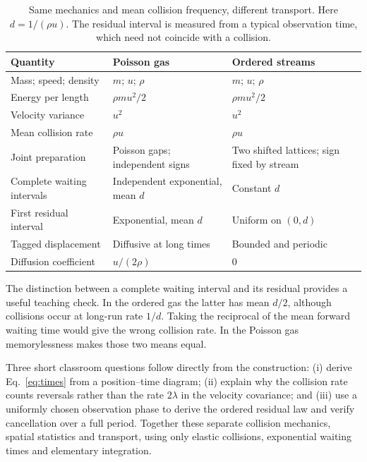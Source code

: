 \documentclass[11pt,a4paper]{article}
\begin{document}
\begin{table}[ht]
\centering\small
\begin{tabular}{@{}p{}p{}p{}@{}}
\toprule
Quantity & Poisson gas & Ordered streams\\
\midrule
Mass; speed; density & $m$; $u$; $\rho$ & $m$; $u$; $\rho$\\
Energy per length & $\rho mu^2/2$ & $\rho mu^2/2$\\
Velocity variance & $u^2$ & $u^2$\\
Mean collision rate & $\rho u$ & $\rho u$\\
Joint preparation & Poisson gaps; independent signs & Two shifted lattices; sign fixed by stream\\
Complete waiting intervals & Independent exponential, mean $d$ & Constant $d$\\
First residual interval & Exponential, mean $d$ & Uniform on $(0,d)$\\
Tagged displacement & Diffusive at long times & Bounded and periodic\\
Diffusion coefficient & $u/(2\rho)$ & $0$\\
\bottomrule
\end{tabular}
\caption{Same mechanics and mean collision frequency, different transport.
Here $d=1/(\rho u)$. The residual interval is measured from a typical observation
time, which need not coincide with a collision.}
\label{tab:comparison}
\end{table}

The distinction between a complete waiting interval and its residual provides
a useful teaching check. In the ordered gas the latter has mean $d/2$,
although collisions occur at long-run rate $1/d$. Taking the reciprocal of
the mean forward waiting time would give the wrong collision rate. In the
Poisson gas memorylessness makes those two means equal.

Three short classroom questions follow directly from the construction:
(i) derive Eq.~\eqref{eq:times} from a position--time diagram;
(ii) explain why the collision rate counts reversals rather than the rate
$2\lambda$ in the velocity covariance; and (iii) use a uniformly chosen
observation phase to derive the ordered residual law and verify cancellation
over a full period. Together these separate collision mechanics, spatial
statistics and transport, using only elastic collisions, exponential waiting
times and elementary integration.
\end{document}

